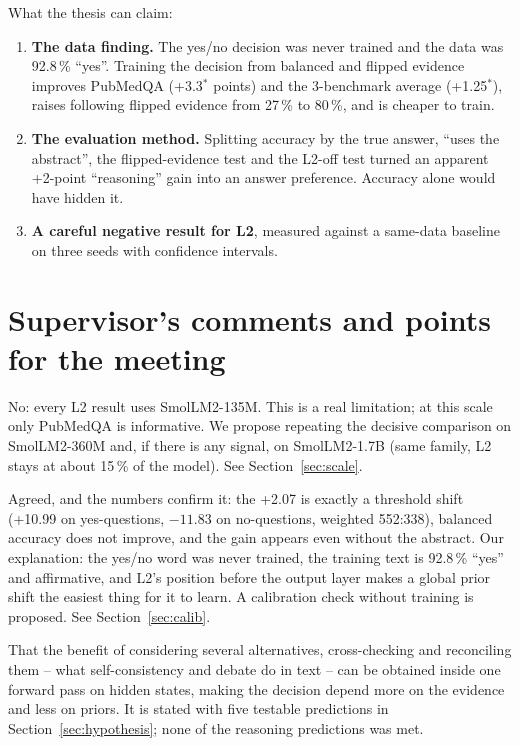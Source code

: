 \documentclass[a4paper,11pt,parskip=half]{scrartcl}
\newcommand{\sig}{\ensuremath{^{\ast}}}
\begin{document}
What the thesis can claim:
\begin{enumerate}
  \item \textbf{The data finding.} The yes/no decision was never trained and the data was 92.8\,\% ``yes''. Training the decision from balanced and flipped evidence improves PubMedQA (+3.3\sig{} points) and the 3-benchmark average (+1.25\sig), raises following flipped evidence from 27\,\% to 80\,\%, and is cheaper to train.
  \item \textbf{The evaluation method.} Splitting accuracy by the true answer, ``uses the abstract'', the flipped-evidence test and the L2-off test turned an apparent +2-point ``reasoning'' gain into an answer preference. Accuracy alone would have hidden it.
  \item \textbf{A careful negative result for L2}, measured against a same-data baseline on three seeds with confidence intervals.
\end{enumerate}

\section{Supervisor's comments and points for the meeting}

\begin{rulebox}[title={1. ``Only a single model -- have you tried a larger LM?''}]
No: every L2 result uses SmolLM2-135M. This is a real limitation; at this scale only PubMedQA is informative. We propose repeating the decisive comparison on SmolLM2-360M and, if there is any signal, on SmolLM2-1.7B (same family, L2 stays at about 15\,\% of the model). See Section~\ref{sec:scale}.
\end{rulebox}

\begin{rulebox}[title={2. ``The `yes' boost looks like a calibration problem -- why did it occur?''}]
Agreed, and the numbers confirm it: the +2.07 is exactly a threshold shift (+10.99 on yes-questions, $-11.83$ on no-questions, weighted 552:338), balanced accuracy does not improve, and the gain appears even without the abstract. Our explanation: the yes/no word was never trained, the training text is 92.8\,\% ``yes'' and affirmative, and L2's position before the output layer makes a global prior shift the easiest thing for it to learn. A calibration check without training is proposed. See Section~\ref{sec:calib}.
\end{rulebox}

\begin{rulebox}[title={3. ``What is the working hypothesis behind L2?''}]
That the benefit of considering several alternatives, cross-checking and reconciling them -- what self-consistency and debate do in text -- can be obtained inside one forward pass on hidden states, making the decision depend more on the evidence and less on priors. It is stated with five testable predictions in Section~\ref{sec:hypothesis}; none of the reasoning predictions was met.
\end{rulebox}
\end{document}
